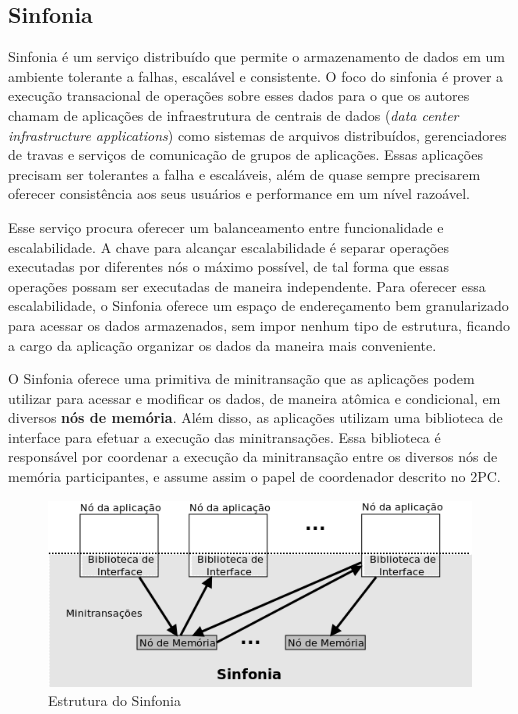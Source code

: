 \documentclass[11pt,twoside,a4paper]{book}
\begin{document}
\subsection{Sinfonia}
Sinfonia é um serviço distribuído que permite o armazenamento de dados em um ambiente tolerante a falhas, escalável e consistente. O foco do sinfonia é prover a execução transacional de operações sobre esses dados para o que os autores chamam de aplicações de infraestrutura de centrais de dados (\emph{data center infrastructure applications}) como sistemas de arquivos distribuídos, gerenciadores de travas e serviços de comunicação de grupos de aplicações. Essas aplicações precisam ser tolerantes a falha e escaláveis, além de quase sempre precisarem oferecer consistência aos seus usuários e performance em um nível razoável.

Esse serviço procura oferecer um balanceamento entre funcionalidade e escalabilidade. A chave para alcançar escalabilidade é separar operações executadas por diferentes nós o máximo possível, de tal forma que essas operações possam ser executadas de maneira independente. Para oferecer essa escalabilidade, o Sinfonia oferece um espaço de endereçamento bem granularizado para acessar os dados armazenados, sem impor nenhum tipo de estrutura, ficando a cargo da aplicação organizar os dados da maneira mais conveniente.

O Sinfonia oferece uma primitiva de minitransação que as aplicações podem utilizar para acessar e modificar os dados, de maneira atômica e condicional, em diversos \textbf{nós de memória}. Além disso, as aplicações utilizam uma biblioteca de interface para efetuar a execução das minitransações. Essa biblioteca é responsável por coordenar a execução da minitransação entre os diversos nós de memória participantes, e assume assim o papel de coordenador descrito no 2PC.

\begin{figure}
  \centering
  \includegraphics[width=\textwidth]{sinfonia} 
  \caption{Estrutura do Sinfonia}
  \label{fig:sinfonia} 
\end{figure}
\end{document}
